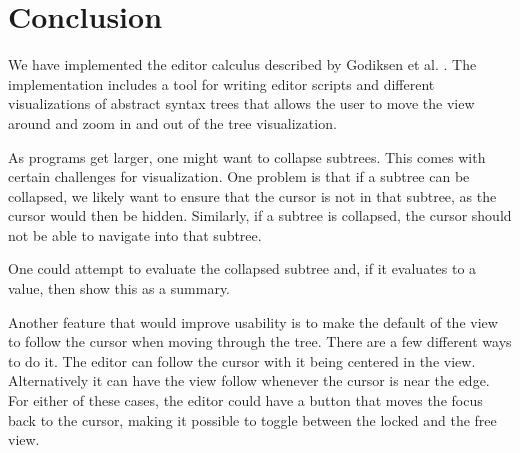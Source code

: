 \section{Conclusion}
\label{conclusion}

We have implemented the
editor calculus described by Godiksen et al. \pepm. The implementation
includes a tool for writing editor scripts and different
visualizations of abstract syntax trees that allows the user to move the view around and
zoom in and out of the tree visualization.

As programs get larger, one might want to collapse subtrees. This
comes with certain challenges for visualization. One problem is that if a subtree can be
collapsed, we likely want to ensure that the cursor is not in that
subtree, as the cursor would then be hidden. Similarly, if a subtree
is collapsed, the cursor should not be able to navigate into that
subtree.

One could attempt to evaluate the collapsed subtree and, if it
evaluates to a value, then show this as a summary.

Another feature that would improve usability is to make the default of the view
to follow the cursor when moving through the tree. There are a few different
ways to do it. The editor can follow the cursor with it being centered in the
view. Alternatively it can have the view follow whenever the cursor is near the
edge. For either of these cases, the editor could have a button that moves the
focus back to the cursor, making it possible to toggle between the locked and
the free view.


